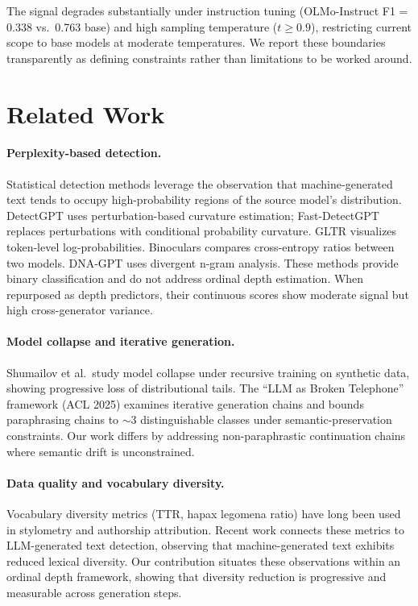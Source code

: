 \documentclass[11pt,a4paper]{article}
\begin{document}
The signal degrades substantially under instruction tuning (OLMo-Instruct F1 = 0.338 vs.\ 0.763 base) and high sampling temperature ($t \geq 0.9$), restricting current scope to base models at moderate temperatures.
We report these boundaries transparently as defining constraints rather than limitations to be worked around.

\section{Related Work}

\paragraph{Perplexity-based detection.}
Statistical detection methods leverage the observation that machine-generated text tends to occupy high-probability regions of the source model's distribution.
DetectGPT \cite{mitchell2023detectgpt} uses perturbation-based curvature estimation; Fast-DetectGPT \cite{bao2024fast} replaces perturbations with conditional probability curvature.
GLTR \cite{gehrmann2019gltr} visualizes token-level log-probabilities.
Binoculars \cite{hans2024binoculars} compares cross-entropy ratios between two models.
DNA-GPT \cite{yang2024dnagpt} uses divergent n-gram analysis.
These methods provide binary classification and do not address ordinal depth estimation.
When repurposed as depth predictors, their continuous scores show moderate signal but high cross-generator variance.

\paragraph{Model collapse and iterative generation.}
Shumailov et al.\ study model collapse under recursive training on synthetic data, showing progressive loss of distributional tails.
The ``LLM as Broken Telephone'' framework (ACL 2025) examines iterative generation chains and bounds paraphrasing chains to $\sim$3 distinguishable classes under semantic-preservation constraints.
Our work differs by addressing non-paraphrastic continuation chains where semantic drift is unconstrained.

\paragraph{Data quality and vocabulary diversity.}
Vocabulary diversity metrics (TTR, hapax legomena ratio) have long been used in stylometry and authorship attribution.
Recent work connects these metrics to LLM-generated text detection, observing that machine-generated text exhibits reduced lexical diversity.
Our contribution situates these observations within an ordinal depth framework, showing that diversity reduction is progressive and measurable across generation steps.
\end{document}

